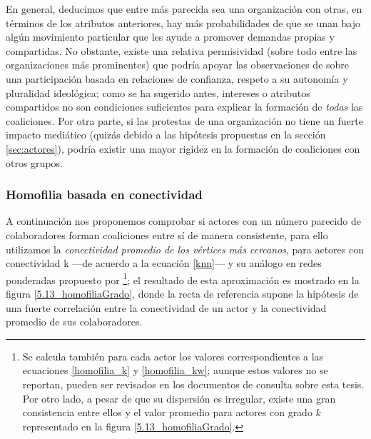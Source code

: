 \documentclass[letterpaper, 11pt]{book}
\theoremstyle{definition}
\theoremstyle{remark}
\begin{document}
En general, deducimos que entre más parecida sea una organización con otras, en términos de los atributos anteriores, hay más probabilidades de que se unan bajo algún movimiento particular que les ayude a promover demandas propias y compartidas. 
No obstante, existe una relativa permisividad (sobre todo entre las organizaciones más prominentes) que podría apoyar las observaciones de \citet{2015_Cadena_Redes} sobre una participación basada en relaciones de confianza, respeto a su autonomía y pluralidad ideológica; como se ha sugerido antes, intereses o atributos compartidos no son condiciones suficientes para explicar la formación de \emph{todas} las coaliciones. 
Por otra parte, si las protestas de una organización no tiene un fuerte impacto mediático (quizás debido a las hipótesis propuestas en la sección \ref{sec:actores}), podría existir una mayor rigidez en la formación de coaliciones con otros grupos. 


\subsubsection{Homofilia basada en conectividad}
\label{subsubsec:homofiliaGrado__proyec}

A continuación nos proponemos comprobar si actores con un número parecido de colaboradores forman coaliciones entre sí de manera consistente, para ello utilizamos la \emph{conectividad promedio de los vértices más cercanos}, para actores con conectividad k ---de acuerdo a la ecuación \ref{knn}--- y su análogo en redes ponderadas propuesto por \citet{2004_Barrat_ComplexNetworks}\footnote{
    Se calcula también para cada actor los valores correspondientes a las ecuaciones \ref{homofilia_k} y \ref{homofilia_kw}; aunque estos valores no se reportan, pueden ser revisados en los documentos de consulta sobre esta tesis. 
    Por otro lado, a pesar de que su dispersión es irregular, existe una gran consistencia entre ellos y el valor promedio para actores con grado $k$ representado en la figura \ref{5.13_homofiliaGrado}. 
}; el resultado de esta aproximación es mostrado en la figura \ref{5.13_homofiliaGrado}, donde la recta de referencia supone la hipótesis de una fuerte correlación entre la conectividad de un actor y la conectividad promedio de sus colaboradores. 
\end{document}
